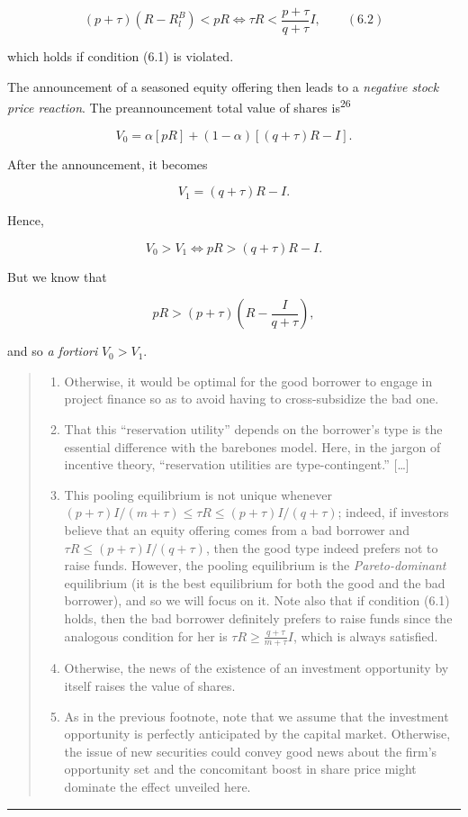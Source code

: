 \documentclass[11pt,a4paper]{article}
\newcommand{\stmtend}{\par\endgroup\nopagebreak\noindent\rule{\linewidth}{0.4pt}\par\medskip}
\begin{document}
\[(p + \tau)(R - R_l^B) < pR \iff \tau R < \frac{p + \tau}{q + \tau} I, \qquad (6.2)\]

which holds if condition (6.1) is violated.

The announcement of a seasoned equity offering then leads to a \emph{negative stock price reaction}.
The preannouncement total value of shares is\textsuperscript{26}

\[V_0 = \alpha[pR] + (1 - \alpha)[(q + \tau)R - I].\]

After the announcement, it becomes

\[V_1 = (q + \tau)R - I.\]

Hence,

\[V_0 > V_1 \iff pR > (q + \tau)R - I.\]

But we know that

\[pR > (p + \tau)\left(R - \frac{I}{q + \tau}\right),\]

and so \emph{a fortiori} \(V_0 > V_1\).

\begin{quote}
\begin{enumerate}
\def\labelenumi{\arabic{enumi}.}
\setcounter{enumi}{21}
\item
  Otherwise, it would be optimal for the good borrower to engage in project finance so as to avoid
  having to cross-subsidize the bad one.
\item
  That this ``reservation utility'' depends on the borrower's type is the essential difference with
  the barebones model. Here, in the jargon of incentive theory, ``reservation utilities are
  type-contingent.'' {[}\ldots{]}
\item
  This pooling equilibrium is not unique whenever
  \((p + \tau)I/(m + \tau) \leqslant \tau R \leqslant (p + \tau)I/(q + \tau)\); indeed, if investors
  believe that an equity offering comes from a bad borrower and
  \(\tau R \leqslant (p + \tau)I/(q + \tau)\), then the good type indeed prefers not to raise funds.
  However, the pooling equilibrium is the \emph{Pareto-dominant} equilibrium (it is the best
  equilibrium for both the good and the bad borrower), and so we will focus on it. Note also that if
  condition (6.1) holds, then the bad borrower definitely prefers to raise funds since the analogous
  condition for her is \(\tau R \geqslant \frac{q + \tau}{m + \tau} I\), which is always satisfied.
\item
  Otherwise, the news of the existence of an investment opportunity by itself raises the value of
  shares.
\item
  As in the previous footnote, note that we assume that the investment opportunity is perfectly
  anticipated by the capital market. Otherwise, the issue of new securities could convey good news
  about the firm's opportunity set and the concomitant boost in share price might dominate the
  effect unveiled here.
\end{enumerate}
\end{quote}
\stmtend
\end{document}
